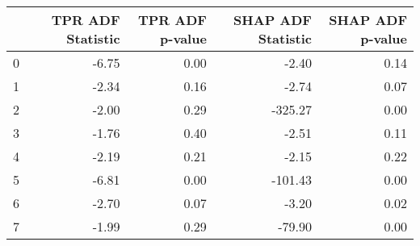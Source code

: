 \begin{tabular}{lrrrr}
\toprule
 & TPR ADF Statistic & TPR ADF p-value & SHAP ADF Statistic & SHAP ADF p-value \\
\midrule
0 & -6.75 & 0.00 & -2.40 & 0.14 \\
1 & -2.34 & 0.16 & -2.74 & 0.07 \\
2 & -2.00 & 0.29 & -325.27 & 0.00 \\
3 & -1.76 & 0.40 & -2.51 & 0.11 \\
4 & -2.19 & 0.21 & -2.15 & 0.22 \\
5 & -6.81 & 0.00 & -101.43 & 0.00 \\
6 & -2.70 & 0.07 & -3.20 & 0.02 \\
7 & -1.99 & 0.29 & -79.90 & 0.00 \\
\bottomrule
\end{tabular}
